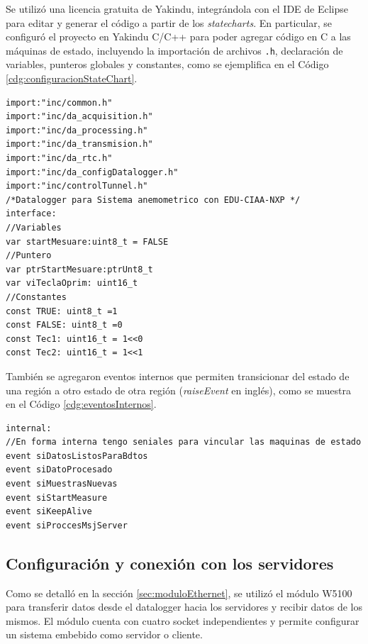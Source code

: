 Se utilizó una licencia gratuita de Yakindu, integrándola con el IDE de Eclipse para editar y generar el código a partir de los \textit{statecharts}. En particular, se configuró el proyecto en Yakindu C/C++ para poder agregar código en C a las máquinas de estado, incluyendo la importación de archivos \texttt{.h}, declaración de variables, punteros globales y constantes, como se ejemplifica en el Código \ref{cdg:configuracionStateChart}.


\begin{lstlisting}[style=yakindustyle, caption={Configuración principal del modelo statechart dataloggerSA.}, label=cdg:configuracionStateChart,basicstyle=\ttfamily\fontsize{8}{8}\selectfont] 
import:"inc/common.h"
import:"inc/da_acquisition.h"
import:"inc/da_processing.h"
import:"inc/da_transmision.h"
import:"inc/da_rtc.h"
import:"inc/da_configDatalogger.h"
import:"inc/controlTunnel.h"
/*Datalogger para Sistema anemometrico con EDU-CIAA-NXP */
interface:
//Variables
var startMesuare:uint8_t = FALSE
//Puntero
var ptrStartMesuare:ptrUnt8_t
var viTeclaOprim: uint16_t
//Constantes
const TRUE: uint8_t =1
const FALSE: uint8_t =0
const Tec1: uint16_t = 1<<0
const Tec2: uint16_t = 1<<1
\end{lstlisting}

 También se agregaron eventos internos que permiten transicionar del estado de una región a otro estado de otra región (\textit{raiseEvent} en inglés), como se muestra en el Código \ref{cdg:eventosInternos}.
\begin{lstlisting}[style=yakindustyle, caption={Declaración de eventos internos que permiten transicionar entre regiones del statechart.}, label=cdg:eventosInternos,basicstyle=\ttfamily\fontsize{8}{8}\selectfont]
internal:
//En forma interna tengo seniales para vincular las maquinas de estado
event siDatosListosParaBdtos
event siDatoProcesado
event siMuestrasNuevas
event siStartMeasure
event siKeepAlive
event siProccesMsjServer
\end{lstlisting}


\subsection{Configuración y conexión con los servidores}\label{sec:confServers}
Como se detalló en la sección \ref{sec:moduloEthernet}, se utilizó el módulo W5100 para transferir datos desde el datalogger hacia los servidores y recibir datos de los mismos. El módulo cuenta con cuatro socket independientes y permite configurar un sistema embebido como servidor o cliente.


